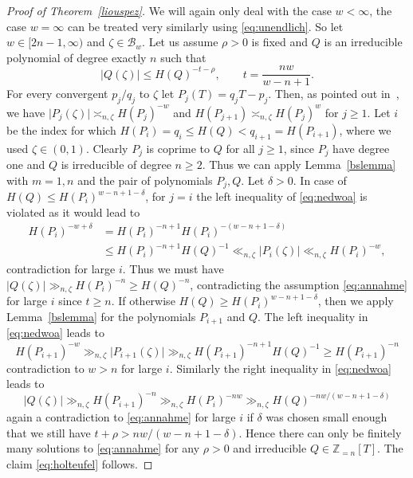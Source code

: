 \documentclass[12pt]{amsart}
\theoremstyle{definition}
\begin{document}
\begin{proof}[Proof of Theorem~\ref{liouspez}]    
We will again only deal with the case $w<\infty$, the case $w=\infty$ can be treated very similarly using \eqref{eq:unendlich}. 
So let $w\in [2n-1, \infty)$ and $\zeta\in \mathscr{B}_{w}$.
Let us assume $\rho>0$ is fixed and $Q$ is an irreducible polynomial of degree exactly $n$ such that 
%
\begin{equation} \label{eq:annahme}
\vert Q(\zeta)\vert \leq H(Q)^{-t-\rho}, \qquad t=\frac{nw}{w-n+1}.
\end{equation}
%
For every convergent $p_{j}/q_{j}$ to $\zeta$
let $P_{j}(T)=q_{j}T-p_{j}$.  
Then, as pointed out in~\cite{bug}, we have $\vert P_{j}(\zeta)\vert \asymp_{n,\zeta} H(P_{j})^{-w}$ and
$H(P_{j+1})\asymp_{n,\zeta} H(P_{j})^{w}$ for $j\geq 1$.
Let $i$ be the index for which $H(P_{i})=q_{i}\leq H(Q)<q_{i+1}=H(P_{i+1})$, where we used $\zeta\in(0,1)$.
Clearly $P_{j}$ is coprime to $Q$ for all $j\geq 1$, since $P_{j}$ have degree one and $Q$ is irreducible of degree $n\geq 2$.
Thus we can apply Lemma~\ref{bslemma} with $m=1, n$ and the pair of polynomials $P_{j},Q$. 
Let $\delta>0$. In case of $H(Q)\leq H(P_{i})^{w-n+1-\delta}$,
for $j=i$ the left inequality of \eqref{eq:nedwoa} is violated as it would lead to
%
\begin{align*}
H(P_{i})^{-w+\delta}&= H(P_{i})^{-n+1}H(P_{i})^{-(w-n+1-\delta)}\\
&\leq H(P_{i})^{-n+1}H(Q)^{-1}\ll_{n,\zeta} 
\vert P_{i}(\zeta)\vert \ll_{n,\zeta} H(P_{i})^{-w},
\end{align*}
%
contradiction for large $i$. Thus we must have
$\vert Q(\zeta)\vert\gg_{n,\zeta} H(P_{i})^{-n}\geq H(Q)^{-n}$, contradicting the assumption \eqref{eq:annahme} 
for large $i$ since $t\geq n$. 
If otherwise $H(Q)\geq H(P_{i})^{w-n+1-\delta}$, then we apply Lemma~\ref{bslemma} for the polynomials $P_{i+1}$ and $Q$.
The left inequality in \eqref{eq:nedwoa} leads to
%
\[
H(P_{i+1})^{-w}\gg_{n,\zeta} \vert P_{i+1}(\zeta)\vert\gg_{n,\zeta} H(P_{i+1})^{-n+1}H(Q)^{-1}\geq  H(P_{i+1})^{-n}
\]
%
contradiction to $w>n$ for large $i$. Similarly the right inequality in \eqref{eq:nedwoa} leads to
%
\[
\vert Q(\zeta)\vert\gg_{n,\zeta} H(P_{i+1})^{-n}\gg_{n,\zeta} H(P_{i})^{-nw}\gg_{n,\zeta} H(Q)^{-nw/(w-n+1-\delta)}
\]
%
again a contradiction to \eqref{eq:annahme} for large $i$ if $\delta$ was chosen small enough that we still
have $t+\rho>nw/(w-n+1-\delta)$. Hence there can only be finitely many solutions to \eqref{eq:annahme} for any $\rho>0$
and irreducible $Q\in\mathbb{Z}_{=n}[T]$.
The claim \eqref{eq:holteufel} follows.
\end{proof}
\end{document}
